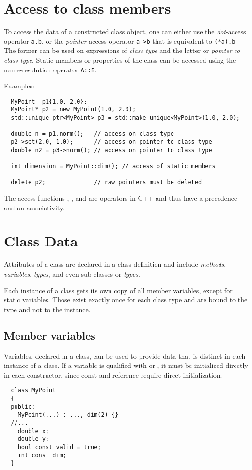 \section{Access to class members}
To access the data of a constructed class object, one can either use the \textit{dot}-access operator \texttt{a.b},
or the \textit{pointer}-access operator \texttt{a->b} that is equivalent to \texttt{(*a).b}. The former can be used on expressions of \emph{class type} and the latter
or \emph{pointer to class type}. Static members or properties of the class can be accessed using the name-resolution operator \texttt{A::B}.

Examples:
\begin{verbatim}
  MyPoint  p1{1.0, 2.0};
  MyPoint* p2 = new MyPoint(1.0, 2.0);
  std::unique_ptr<MyPoint> p3 = std::make_unique<MyPoint>(1.0, 2.0);

  double n = p1.norm();   // access on class type
  p2->set(2.0, 1.0);      // access on pointer to class type
  double n2 = p3->norm(); // access on pointer to class type

  int dimension = MyPoint::dim(); // access of static members

  delete p2;              // raw pointers must be deleted
\end{verbatim}

\begin{rem}
  The access functions , \cpp{->}, and \cpp{::} are operators in C++ and thus have a precedence and an associativity.
\end{rem}

\section{Class Data\label{sec:class-attributes}}
Attributes of a class are declared in a class definition and include \emph{methods}, \emph{variables}, \emph{types}, and even sub-classes or \emph{types}.

Each instance of a class gets its own copy of all member variables, except for static variables. Those exist exactly once for each class type and are bound
to the type and not to the instance.

\subsection{Member variables}
Variables, declared in a class, can be used to provide data that is distinct in each instance of a class. If a variable is qualified with  or \cpp{&},
it must be initialized directly in each constructor, since const and reference require direct initialization.
%
\begin{verbatim}
  class MyPoint
  {
  public:
    MyPoint(...) : ..., dim(2) {}
  //...
    double x;
    double y;
    bool const valid = true;
    int const dim;
  };
\end{verbatim}


